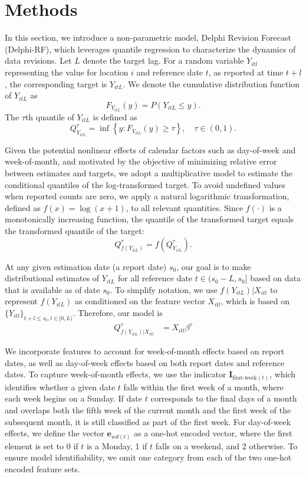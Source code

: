 \section{Methods}
In this section, we introduce a non-parametric model, Delphi Revision Forecast (Delphi-RF), which leverages quantile regression to characterize the dynamics of data revisions. Let $L$ denote the target lag. For a random variable $Y_{itl}$ representing the value for location $i$ and reference date $t$, as reported at time $t + l$, the corresponding target is $Y_{itL}$. We denote the cumulative distribution function of $Y_{itL}$ as
\[
F_{Y_{itL}}(y) = P(Y_{itL} \leq y).
\]
The $\tau$th quantile of $Y_{itL}$ is defined as
\[
Q_{Y_{itL}}^{\tau} = \inf \left\{ y : F_{Y_{itL}}(y) \geq \tau \right\}, \quad \tau \in (0, 1).
\]

Given the potential nonlinear effects of calendar factors such as day-of-week and week-of-month, and motivated by the objective of minimizing relative error between estimates and targets, we adopt a multiplicative model to estimate the conditional quantiles of the log-transformed target. To avoid undefined values when reported counts are zero, we apply a natural logarithmic transformation, defined as $f(x) = \log(x + 1)$, to all relevant quantities. Since $f(\cdot)$ is a monotonically increasing function, the quantile of the transformed target equals the transformed quantile of the target:
\[
Q_{f(Y_{itL})}^{\tau} = f\left(Q_{Y_{itL}}^{\tau}\right).
\]

At any given estimation date (a report date) $s_0$, our goal is to make distributional estimates of $Y_{itL}$ for all reference date $t \in (s_0-L, s_0]$ based on data that is available as of date $s_0$. To simplify notation, we use $f(Y_{itL})|X_{itl}$ to represent $f(Y_{itL})$ as conditioned on the feature vector $X_{itl}$, which is based on $\{Y_{itl}\}_{t+l \leq s_0, l\in [0, L)}$. Therefore, our model is 
\begin{align*} 
Q_{f(Y_{itL})|X_{itl}}^{\tau} &=  X_{itl}\beta^{\tau}
\end{align*}

We incorporate features to account for week-of-month effects based on report dates, as well as day-of-week effects based on both report dates and reference dates. To capture week-of-month effects, we use the indicator \( \mathbf{I}_{\text{first-week}(t)} \), which identifies whether a given date \( t \) falls within the first week of a month, where each week begins on a Sunday. If date \( t \) corresponds to the final days of a month and overlaps both the fifth week of the current month and the first week of the subsequent month, it is still classified as part of the first week. For day-of-week effects, we define the vector \( \mathbf{e}_{wd(t)} \) as a one-hot encoded vector, where the first element is set to 0 if \( t \) is a Monday, 1 if \( t \) falls on a weekend, and 2 otherwise. To ensure model identifiability, we omit one category from each of the two one-hot encoded feature sets.

